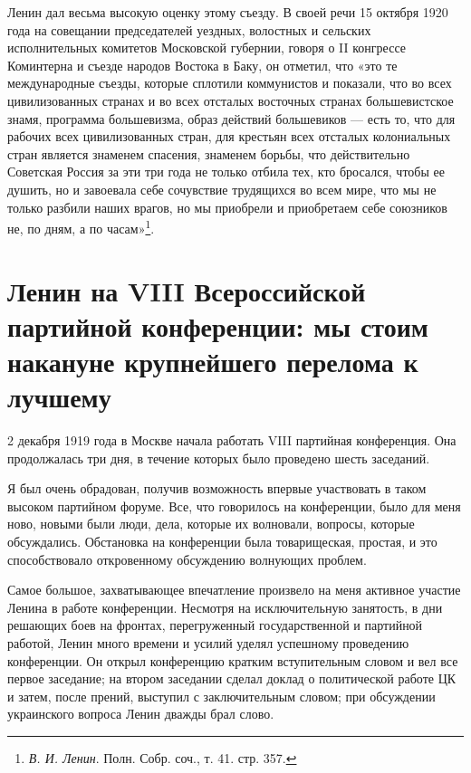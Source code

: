 \documentclass[12pt, a4paper, openany]{book}
\begin{document}
Ленин дал весьма высокую оценку этому съезду. В своей речи 15 октября 1920 года на совещании председателей уездных, волостных и сельских исполнительных комитетов Московской губернии, говоря о II конгрессе Коминтерна и съезде народов Востока в Баку, он отметил, что «это те международные съезды, которые сплотили коммунистов и показали, что во всех цивилизованных странах и во всех отсталых восточных странах большевистское знамя, программа большевизма, образ действий большевиков — есть то, что для рабочих всех цивилизованных стран, для крестьян всех отсталых колониальных стран является знаменем спасения, знаменем борьбы, что действительно Советская Россия за эти три года не только отбила тех, кто бросался, чтобы ее душить, но и завоевала себе сочувствие трудящихся во всем мире, что мы не только разбили наших врагов, но мы приобрели и приобретаем себе союзников не, по дням, а по часам»\footnote{\textit{В. И. Ленин}. Полн. Собр. соч., т. 41. стр. 357.}.

\newpage
\section[Ленин на VIII Всероссийской партийной конференции: мы стоим накануне крупнейшего перелома к лучшему]{\center \textbf{Ленин на VIII Всероссийской партийной конференции: мы стоим накануне крупнейшего перелома к лучшему}}


2 декабря 1919 года в Москве начала работать VIII партийная конференция. Она продолжалась три дня, в течение которых было проведено шесть заседаний.

Я был очень обрадован, получив возможность впервые участвовать в таком высоком партийном форуме. Все, что говорилось на конференции, было для меня ново, новыми были люди, дела, которые их волновали, вопросы, которые обсуждались. Обстановка на конференции была товарищеская, простая, и это способствовало откровенному обсуждению волнующих проблем.

Самое большое, захватывающее впечатление произвело на меня активное участие Ленина в работе конференции. Несмотря на исключительную занятость, в дни решающих боев на фронтах, перегруженный государственной и партийной работой, Ленин много времени и усилий уделял успешному проведению конференции. Он открыл конференцию кратким вступительным словом и вел все первое заседание; на втором заседании сделал доклад о политической работе ЦК и затем, после прений, выступил с заключительным словом; при обсуждении украинского вопроса Ленин дважды брал слово.
\end{document}
